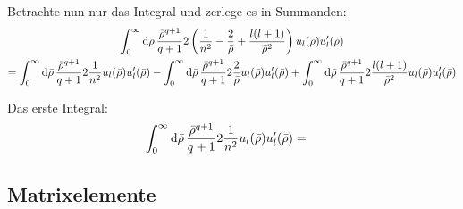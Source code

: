 Betrachte nun nur das Integral und zerlege es in Summanden:
\begin{gather*}
	\int_0^\infty \dif \bar\rho \,
	\frac{\bar\rho^{q+1}}{q+1} 2 \del{\frac1{n^2} - \frac2{\bar\rho}
	+ \frac{l(l+1)}{\bar\rho^2}} u_l(\bar\rho) u'_l(\bar\rho) \\
	=
	\int_0^\infty \dif \bar\rho \,
	\frac{\bar\rho^{q+1}}{q+1} 2
	\frac1{n^2}
	u_l(\bar\rho) u'_l(\bar\rho)
	-
	\int_0^\infty \dif \bar\rho \,
	\frac{\bar\rho^{q+1}}{q+1} 2
	\frac2{\bar\rho}
	u_l(\bar\rho) u'_l(\bar\rho)
	+
	\int_0^\infty \dif \bar\rho \,
	\frac{\bar\rho^{q+1}}{q+1} 2
	\frac{l(l+1)}{\bar\rho^2}
	u_l(\bar\rho) u'_l(\bar\rho)
\end{gather*}

Das erste Integral:
\begin{align*}
	\int_0^\infty \dif \bar\rho \,
	\frac{\bar\rho^{q+1}}{q+1} 2
	\frac1{n^2}
	u_l(\bar\rho) u'_l(\bar\rho)
	&= 
\end{align*}

\subsection{Matrixelemente}

\fehlt


\IfFileExists{\bibliographyfile}{
}{}



